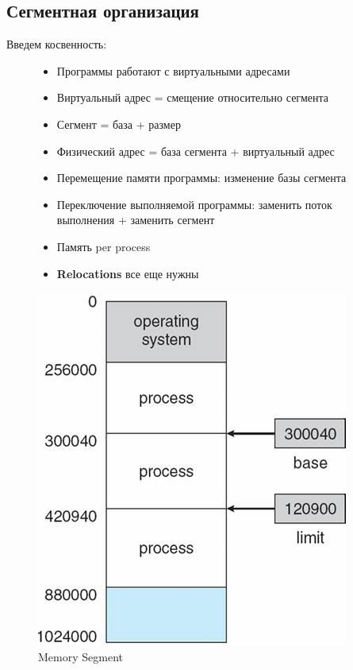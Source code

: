 \documentclass[../../lectures.tex]{subfiles}
\begin{document}
\subsection{Сегментная организация}
Введем косвенность:
\begin{figure}[H]
\begin{minipage}[c]{0.5\linewidth}
\centering
\begin{itemize}
    \item Программы работают с виртуальными адресами
    \item Виртуальный адрес = смещение относительно сегмента
    \item Сегмент = база + размер
    \item Физический адрес = база сегмента + виртуальный адрес
    \item Перемещение памяти программы: изменение базы сегмента
    \item Переключение выполняемой программы: заменить поток выполнения + заменить сегмент
    \item Память per process
    \item \textbf{Relocations} все еще нужны
\end{itemize}
\end{minipage}
\hspace{0.5cm}
\begin{minipage}[c]{0.5\linewidth}
\centering
\includegraphics[width=\textwidth]{images/memory-segment.jpg}
\caption{Memory Segment}
\end{minipage}
\end{figure}
\end{document}
